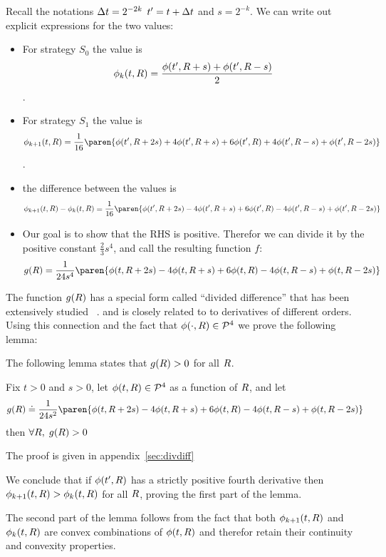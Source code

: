 \documentclass{article}[12pt]
\begin{document}
\proof
Recall the notations $\Delta t = 2^{-2k}$ $t' = t+\Delta t$ and $s=2^{-k}$.
We can write out explicit expressions for the two values:
\begin{itemize}
\item For strategy $S_0$ the value is
  $$\phi_k(t, R) = \frac{\phi(t',R+s)+ \phi(t',R-s)}{2} $$.
\item For strategy $S_1$ the value is
  $$\pot_{k+1}(t, \R) = \frac{1}{16}
  \paren{\pot(t',\R+2s)+ 4\pot(t',\R+s)+ 6\pot(t',\R)+  4\pot(t',\R-s)+ \pot(t',\R-2s)}
  $$.
\item the difference between the values is
 $$ \pot_{k+1}(t, \R)-\pot_{k}(t, \R) = \frac{1}{16}
  \paren{\pot(t',\R+2s)- 4\pot(t',\R+s)+ 6\pot(t',\R)-
    4\pot(t',\R-s)+ \pot(t',\R-2s)}
  $$
\item Our goal is to show that the RHS is positive. Therefor we can
  divide it by the positive constant  $\frac{2}{3} s^4$, and call the
  resulting function $f$:
  \begin{equation} \label{eqn:divdiff}
  g(\R)=\frac{1}{24s^4} \paren{\pot(t,\R+2s)- 4\pot(t,\R+s)+ 6\pot(t,\R)-
    4\pot(t,\R-s)+ \pot(t,\R-2s)}
  \end{equation}
\end{itemize}

The function $g(R)$ has a special form called ``divided difference''
that has been extensively studied ~\cite{popoviciu1965certaines,butt2016generalization, de2005divided}.
and is closely related to to derivatives of different orders. Using
this connection and the fact that $\phi(\cdot,R) \in {\cal P}^{4}$ we prove
the following lemma:

The following lemma states that $g(R)>0$ for all $R$.
\begin{lemma} \label{lemma:divdiff}
Fix $t>0$ and $s>0$, let $\phi(t,R) \in {\cal P}^{4}$ as a function of $R$,
and let 
\begin{equation}
g(\R)\doteq\frac{1}{24s^2} \paren{\pot(t,\R+2s)- 4\pot(t,\R+s)+ 6\pot(t,\R)-
    4\pot(t,\R-s)+ \pot(t,\R-2s)}
\end{equation}
then $\forall R,\; g(R)>0$ 
\end{lemma}
The proof is given in appendix~\ref{sec:divdiff}

We conclude that if $\phi(t',R)$ has a strictly positive fourth
derivative then $\phi_{k+1}(t,R) > \phi_{k}(t,R)$ for all $R$, proving
the first part of the lemma.

The second part of the lemma follows from the fact that
both $\phi_{k+1}(t,R)$ and $\phi_{k}(t,R)$ are convex combinations of
$\phi(t,R)$ and therefor retain their continuity and convexity properties.
\end{document}
